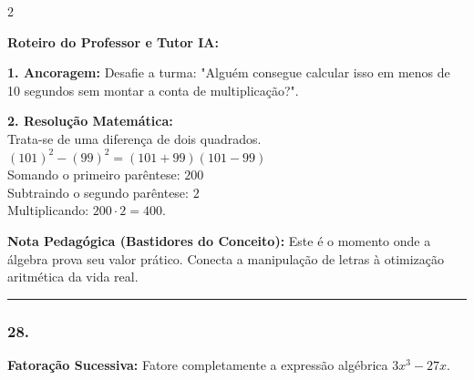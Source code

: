 \begin{multicols*}{2}
\ifgabarito
    \begin{tcolorbox}[colback=CorTitUm!5, colframe=CorTitUm, boxrule=1pt, arc=4pt, left=6pt, right=6pt, top=6pt, bottom=6pt]
    \small\textbf{\textcolor{CorTitUm}{Roteiro do Professor e Tutor IA:}}\par\vspace{0.1cm}
    \color{CinzaEscuro}
    \textbf{1. Ancoragem:} Desafie a turma: "Alguém consegue calcular isso em menos de 10 segundos sem montar a conta de multiplicação?".\par\vspace{0.1cm}
    \textbf{2. Resolução Matemática:}\\
    Trata-se de uma diferença de dois quadrados.\\
    $(101)^2 - (99)^2 = (101 + 99)(101 - 99)$\\
    Somando o primeiro parêntese: $200$\\
    Subtraindo o segundo parêntese: $2$\\
    Multiplicando: $200 \cdot 2 = 400$.
    \end{tcolorbox}
    \vspace{0.15cm}
    
    \begin{boxexplicacao}
    \textbf{Nota Pedagógica (Bastidores do Conceito):} Este é o momento onde a álgebra prova seu valor prático. Conecta a manipulação de letras à otimização aritmética da vida real.
    \end{boxexplicacao}
\fi

\par\vspace{\espacoQuestao}

\noindent\textcolor{CorLinha}{\rule{\linewidth}{0.5pt}} 
\par\vspace{\espacoPreQuestao}
\subsubsection*{28.} 
\begin{enunciadoLiteral}
\textbf{Fatoração Sucessiva:} Fatore completamente a expressão algébrica $3x^3 - 27x$.
\end{enunciadoLiteral}


\end{multicols*}
